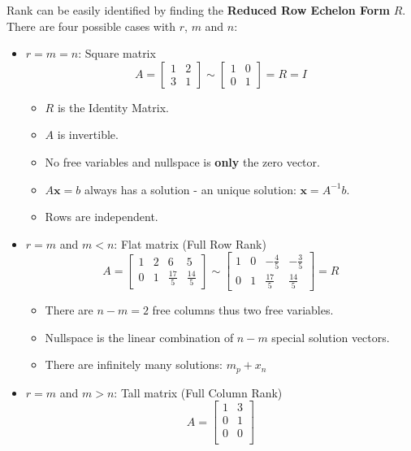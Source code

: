 \documentclass[10pt,a4paper]{article}
\begin{document}
Rank can be easily identified by finding the \textbf{Reduced Row Echelon Form} $R$. There are four
possible cases with $r$, $m$ and $n$:
\begin{itemize}
    \item $r=m=n$: Square matrix 
    $$A=\begin{bmatrix}
        1 & 2\\ 
        3 & 1
        \end{bmatrix} \sim 
        \begin{bmatrix}
        1 & 0\\ 
        0 & 1
        \end{bmatrix} = R = I$$
    \begin{itemize}
        \item $R$ is the Identity Matrix.
        \item $A$ is invertible.
        \item No free variables and nullspace is \textbf{only} the zero vector. 
        \item $A \textbf{x}=b$ always has a solution - an unique solution: $ \textbf{x}=A^{-1}b$.
        \item Rows are independent.
    \end{itemize}
    \item $r=m$ and $m<n$: Flat matrix (Full Row Rank)
    $$A=
    \begin{bmatrix}
    1 & 2 & 6 & 5\\ 
    0 & 1 & \frac{17}{5} & \frac{14}{5} 
    \end{bmatrix} \sim
    \begin{bmatrix}
    1 & 0 & -\frac{4}{5} & -\frac{3}{5}\\ 
    0 & 1 & \frac{17}{5} & \frac{14}{5}
    \end{bmatrix} = R$$
    \begin{itemize}
        \item There are $n-m=2$ free columns thus two free variables.
        \item Nullspace is the linear combination of $n-m$ special solution vectors.
        \item There are infinitely many solutions: $m_p + x_n$
    \end{itemize}
    \item $r=m$ and $m>n$: Tall matrix (Full Column Rank)
    $$A = \begin{bmatrix}
        1 & 3\\ 
        0 & 1\\ 
        0 & 0\\ 

\end{bmatrix}$$
\end{itemize}
\end{document}
